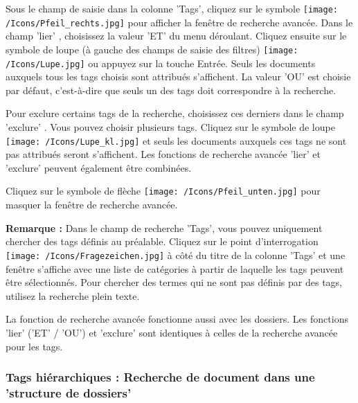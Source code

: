 Sous le champ de saisie dans la colonne 'Tags', cliquez sur le symbole \texttt{[image: /Icons/Pfeil\_rechts.jpg]}  pour afficher la fenêtre de recherche avancée. Dans le champ 'lier' , choisissez la valeur 'ET'  du menu déroulant. Cliquez ensuite sur le symbole de loupe (à gauche des champs de saisie des filtres) \texttt{[image: /Icons/Lupe.jpg]}  ou appuyez sur la touche Entrée. Seuls les documents auxquels tous les tags choisis sont attribués s'affichent. La valeur 'OU' est choisie par défaut, c'est-à-dire que seuls un des tags doit correspondre à la recherche.\newline

Pour exclure certains tags de la recherche, choisissez ces derniers dans le champ 'exclure' . Vous pouvez choisir plusieurs tags. Cliquez sur le symbole de loupe \texttt{[image: /Icons/Lupe\_kl.jpg]} et seuls les documents auxquels ces tags ne sont pas attribués seront s'affichent. Les fonctions de recherche avancée 'lier' et 'exclure' peuvent également être combinées.

\vspace{\baselineskip}

Cliquez sur le symbole de flèche \texttt{[image: /Icons/Pfeil\_unten.jpg]}  pour masquer la fenêtre de recherche avancée.

\vspace{\baselineskip}

\textbf{Remarque :} Dans le champ de recherche 'Tags', vous pouvez uniquement chercher des tags définis au préalable. Cliquez sur le point d'interrogation \texttt{[image: /Icons/Fragezeichen.jpg]} à côté du titre de la colonne 'Tags' et une fenêtre s'affiche avec une liste de catégories à partir de laquelle les tags peuvent être sélectionnés. Pour chercher des termes qui ne sont pas définis par des tags, utilisez la recherche plein texte.

\vspace{\baselineskip}

La fonction de recherche avancée fonctionne aussi avec les dossiers. Les fonctions 'lier' ('ET' / 'OU') et 'exclure' sont identiques à celles de la recherche avancée pour les tags.

\subsubsection{Tags hiérarchiques : Recherche de document dans une 'structure de dossiers'}

